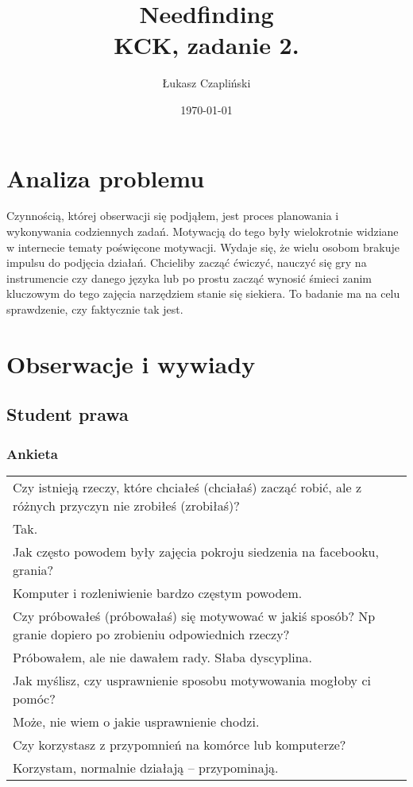 \documentclass[11pt,wide]{mwart}
\title{Needfinding\\{\large KCK, zadanie 2.}}
\author{Łukasz Czapliński}
\date{\today}
\newcommand{\Ta}[1]{
  \begin{tabular}{| p{0.9\textwidth} |}
    \hline
    #1
    \hline
  \end{tabular}
 }
\begin{document}
\thispagestyle{empty}
\maketitle
\pagebreak

\section{Analiza problemu}
Czynnością, której obserwacji się podjąłem, jest proces planowania i wykonywania codziennych zadań. Motywacją do tego były wielokrotnie widziane w internecie tematy poświęcone motywacji. Wydaje się, że wielu osobom brakuje impulsu do podjęcia działań. Chcieliby zacząć ćwiczyć, nauczyć się gry na instrumencie czy danego języka lub po prostu zacząć wynosić śmieci zanim kluczowym do tego zajęcia narzędziem stanie się siekiera. To badanie ma na celu sprawdzenie, czy faktycznie tak jest.
\section{Obserwacje i wywiady}
\subsection{Student prawa}
\subsubsection{Ankieta}
\Ta{Czy istnieją rzeczy, które chciałeś (chciałaś) zacząć robić, ale z różnych przyczyn nie zrobiłeś (zrobiłaś)?\\
\indent Tak.\\
Jak często powodem były zajęcia pokroju siedzenia na facebooku, grania?\\
\indent Komputer i rozleniwienie bardzo częstym powodem.\\
Czy próbowałeś (próbowałaś) się motywować w jakiś sposób? Np granie dopiero po zrobieniu odpowiednich rzeczy?\\
\indent Próbowałem, ale nie dawałem rady. Słaba dyscyplina.\\
Jak myślisz, czy usprawnienie sposobu motywowania mogłoby ci pomóc?\\
\indent Może, nie wiem o jakie usprawnienie chodzi.\\
Czy korzystasz z przypomnień na komórce lub komputerze?\\
\indent Korzystam, normalnie działają – przypominają.\\}
\end{document}
